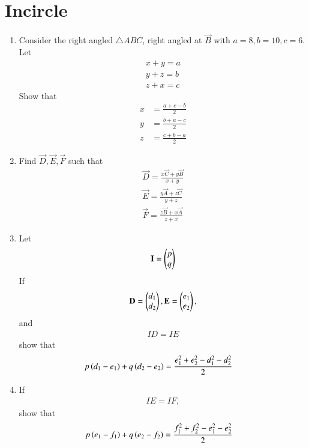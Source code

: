 \documentclass[journal,12pt,twocolumn]{IEEEtran}
\renewcommand\thesection{\arabic{section}}
\begin{document}
\section{Incircle}
\begin{enumerate}[label=\thesection.\arabic*
,ref=\thesection.\theenumi]

\item Consider the right angled $\triangle ABC$, right angled at $\vec{B}$ with $a = 8, b = 10, c = 6$.  Let
\begin{align}
x+y = a
\nonumber \\
y+z = b
\nonumber \\
z+x = c
\label{eq:tang_len}
\end{align}
%
Show that 
\begin{align}
x &=\frac{a+c-b}{2}
\nonumber \\
y &=\frac{b+a-c}{2}
\nonumber \\
z &=\frac{c+b-a}{2}
\end{align}
\item Find $\vec{D}, \vec{E}, \vec{F}$ such that 
\begin{align}
\label{eq:incircle}
\vec{D} = \frac{x\vec{C}+y\vec{B}}{x+y}
\nonumber \\
\vec{E} = \frac{y\vec{A}+z\vec{C}}{y+z}
\nonumber \\
\vec{F} = \frac{z\vec{B}+x\vec{A}}{z+x}
\end{align}
\item Let 
\begin{align}
\label{eq:inradius}
\mathbf{I} = \begin{pmatrix}p \\ q\end{pmatrix}
\end{align}
If 
\begin{align}
\mathbf{D} = \begin{pmatrix}d_1 \\ d_2\end{pmatrix},
\mathbf{E} = \begin{pmatrix}e_1 \\ e_2\end{pmatrix},
\end{align}
and 
\begin{align}
ID = IE 
\end{align}
show that 
\begin{align}
p\left(d_1-e_1\right)+ q\left(d_2-e_2\right) &= \frac{e_1^2+e_2^2-d_1^2-d_2^2}{2}
\end{align}
%
\item If 
\begin{align}
IE = IF,
\end{align}
show that 
\begin{align}
p\left(e_1-f_1\right)+ q\left(e_2-f_2\right) &= \frac{f_1^2+f_2^2-e_1^2-e_2^2}{2}
\end{align}


\end{enumerate}
\end{document}
